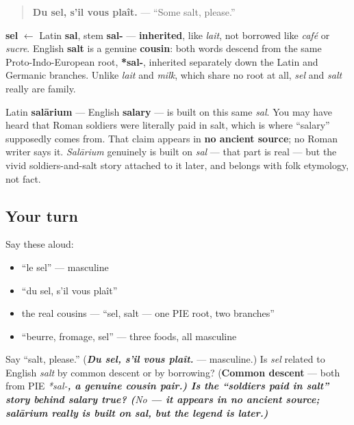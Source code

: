 \begin{quote}
\textbf{Du sel, s'il vous plaît.} — \textquotedblleft{}Some salt, please.\textquotedblright{}
\end{quote}

\begin{cousinweb}
\textbf{sel} $\leftarrow$ Latin \textbf{sal}, stem \textbf{sal-} — \textbf{inherited}, like \emph{lait}, not borrowed like \emph{café} or \emph{sucre}. English \textbf{salt} is a genuine \textbf{cousin}: both words descend from the same Proto-Indo-European root, \textbf{*sal-}, inherited separately down the Latin and Germanic branches. Unlike \emph{lait} and \emph{milk}, which share no root at all, \emph{sel} and \emph{salt} really are family.

Latin \textbf{salārium} — English \textbf{salary} — is built on this same \emph{sal}. You may have heard that Roman soldiers were literally paid in salt, which is where \textquotedblleft{}salary\textquotedblright{} supposedly comes from. That claim appears in \textbf{no ancient source}; no Roman writer says it. \emph{Salārium} genuinely is built on \emph{sal} — that part is real — but the vivid soldiers-and-salt story attached to it later, and belongs with folk etymology, not fact.
\end{cousinweb}

\subsection*{Your turn}
Say these aloud:

\begin{itemize}
\raggedright
  \item \textquotedblleft{}le sel\textquotedblright{} — masculine
  \item \textquotedblleft{}du sel, s'il vous plaît\textquotedblright{}
  \item the real cousins — \textquotedblleft{}sel, salt — one PIE root, two branches\textquotedblright{}
  \item \textquotedblleft{}beurre, fromage, sel\textquotedblright{} — three foods, all masculine
\end{itemize}

\begin{tcolorbox}[breakable,colback=teal!4,colframe=teal!35!black,title={Before you move on}]
Say \textquotedblleft{}salt, please.\textquotedblright{} (\emph{\textbf{Du sel, s'il vous plaît.}} — masculine.) Is \emph{sel} related to English \emph{salt} by common descent or by borrowing? (\textbf{Common descent} — both from PIE \emph{*sal-\emph{\textbf{, a genuine cousin pair.) Is the \textquotedblleft{}soldiers paid in salt\textquotedblright{} story behind \emph{salary} true? (}No\textbf{ — it appears in no ancient source; \emph{salārium} really is built on \emph{sal}, but the legend is later.)}}}
\end{tcolorbox}
